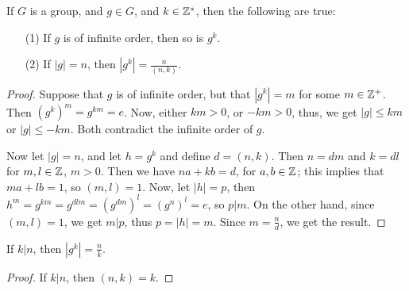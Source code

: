 \begin{lemma}\label{lemma_2.3.6}
  If $G$ is a group, and  $g \in G$, and  $k \in \mathbb{Z}^*$, then the following are
  true:
  \begin{enumerate}
    \item[(1)] If $g$ is of infinite order, then so is  $g^k$.

    \item[(2)] If $|g|=n$, then  $|g^k|=\frac{n}{(n,k)}$.
  \end{enumerate}
\end{lemma}
\begin{proof}
  Suppose that $g$ is of infinite order, but that $|g^k|=m$ for some $m
  \in \mathbb{Z}^+$. Then  $(g^k)^m=g^{km}=e$. Now, either $km>0$, or  $-km>0$, thus,
  we get  $|g| \leq km$ or $|g| \leq -km$. Both contradict the
  infinite order of $g$.

  Now let  $|g|=n$, and let $h=g^k$ and define  $d=(n,k)$. Then $n=dm$ and
  $k=dl$ for  $m,l \in \mathbb{Z}$,  $m>0$. Then we have $na+kb=d$, for $a,b \in \mathbb{Z}$;
  this implies that  $ma+lb=1$, so  $(m,l)=1$. Now, let $|h|=p$, then
  $h^m=g^{km}=g^{dlm}=(g^{dm})^l=(g^n)^l=e$, so $p|m$. On the other hand,
  since  $(m,l)=1$, we get $m|p$, thus  $p=|h|=m$. Since $m=\frac{n}{d}$,
  we get the result.
\end{proof}
\begin{corollary}
  If $k|n$, then  $|g^k|=\frac{n}{k}$.
\end{corollary}
\begin{proof}
  If $k|n$, then  $(n,k)=k$.
\end{proof}

